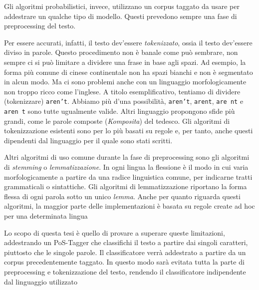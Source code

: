 Gli algoritmi probabilistici, invece, utilizzano un corpus taggato da usare per
addestrare un qualche tipo di modello. Questi prevedono sempre una fase di
preprocessing del testo.

Per essere accurati, infatti, il testo dev'essere \emph{tokenizzato}, ossia il
testo dev'essere diviso in parole. Questo procedimento non \`e banale come pu\`o
sembrare, non sempre ci si pu\`o limitare a dividere una frase in base agli spazi.
Ad esempio, la forma pi\`u comune di cinese continentale non ha spazi bianchi e
non \`e segmentato in alcun modo. Ma ci sono problemi anche con un linguaggio
morfologicamente non troppo ricco come l'inglese. A titolo esemplificativo,
tentiamo di dividere (tokenizzare) \texttt{aren't}. Abbiamo pi\`u d'una possibilit\`a,
\texttt{aren't}, \texttt{arent}, \texttt{are nt} e \texttt{aren t} sono tutte
ugualmente valide. Altri linguaggio propongono sfide pi\`u grandi, come le parole
composte (\emph{Komposita}) del tedesco. Gli algoritmi di tokenizzazione esistenti
sono per lo pi\`u basati su regole e, per tanto, anche questi dipendenti dal
linguaggio per il quale sono stati scritti.

Altri algoritmi di uso comune durante la fase di preprocessing sono gli algoritmi
di \emph{stemming} o \emph{lemmatizzazione}. In ogni lingua la flessione \`e il
modo in cui varia morfologicamente a partire da una radice linguistica comune,
per indicarne tratti grammaticali o sintattiche. Gli algoritmi di lemmatizzazione
riportano la forma flessa di ogni parola sotto un unico \emph{lemma}. Anche per
quanto riguarda questi algoritmi, la maggior parte delle implementazioni \`e
basata su regole create ad hoc per una determinata lingua

Lo scopo di questa tesi \`e quello di provare a superare queste limitazioni,
addestrando un PoS-Tagger che classifichi il testo a partire dai singoli caratteri,
piuttosto che le singole parole. Il classificatore verr\`a addestrato a partire
da un corpus precedentemente taggato. In questo modo sar\`a evitata tutta la parte
di preprocessing e tokenizzazione del testo, rendendo il classificatore indipendente
dal linguaggio utilizzato
